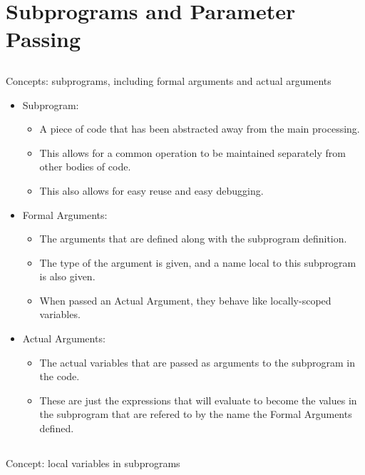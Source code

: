 \section{Subprograms and Parameter Passing}\label{sec:Subprograms}

\subsection{}
Concepts: subprograms, including formal arguments and actual arguments

\begin{itemize}
\item Subprogram:
  \begin{itemize}[noitemsep]
  \item A piece of code that has been abstracted away from the main processing.
  \item This allows for a common operation to be maintained separately from other bodies of code.
  \item This also allows for easy reuse and easy debugging.
  \end{itemize}

\item Formal Arguments:
  \begin{itemize}[noitemsep]
  \item The arguments that are defined along with the subprogram definition.
  \item The type of the argument is given, and a name local to this subprogram is also given.
  \item When passed an Actual Argument, they behave like locally-scoped variables.
  \end{itemize}

\item Actual Arguments:
  \begin{itemize}[noitemsep]
  \item The actual variables that are passed as arguments to the subprogram in the code.
  \item These are just the expressions that will evaluate to become the values in the subprogram that are refered to by the name the Formal Arguments defined.
  \end{itemize}
\end{itemize}

\subsection{}
Concept: local variables in subprograms

